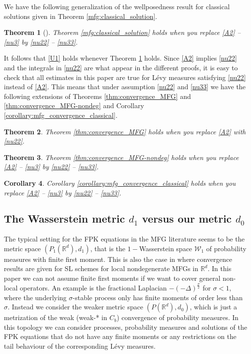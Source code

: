 \documentclass[a4paper,  twoside, 10pt, leqno]{amsart}
\newcommand{\rd}{\mathbb{R}^d}
\newtheorem{thm}{Theorem}[section]
\newtheorem{corollary}[thm]{Corollary}
\theoremstyle{remark}
\theoremstyle{definition}
\begin{document}
We have the following generalization of the wellposedness result for classical solutions
given in Theorem \ref{mfg:classical_solution}.
\begin{thm}[\cite{ersland2020classical}] \label{thm:classical_extension}
    Theorem \ref{mfg:classical_solution} holds when you replace \ref{A2} -- \ref{nu3} by \ref{nu22} -- \ref{nu33}.
 \end{thm}
 It follows that \ref{U1} holds whenever Theorem \ref{thm:classical_extension} holds. Since \ref{A2} implies \ref{nu22} and the integrals in \ref{nu22} are what appear in the different proofs, it is easy to check that all estimates in this paper are true for L\'evy measures satisfying \ref{nu22} instead of \ref{A2}. 
This means that under assumption \ref{nu22} and \ref{nu33} 
we have the following extensions of Theorems \ref{thm:convergence_MFG}
and \ref{thm:convergence_MFG-nondeg} and Corollary \ref{corollary:mfg_convergence_classical}.

\begin{thm}
    Theorem \ref{thm:convergence_MFG} holds when you replace \ref{A2} with \ref{nu22}.
\end{thm}

\begin{thm}
    Theorem \ref{thm:convergence_MFG-nondeg} holds when you replace \ref{A2} -- \ref{nu3} by \ref{nu22} -- \ref{nu33}.
 \end{thm}
\begin{corollary}
    Corollary \ref{corollary:mfg_convergence_classical} holds when you replace \ref{A2} -- \ref{nu3} by \ref{nu22} -- \ref{nu33}.
\end{corollary}

\subsection*{The Wasserstein metric $d_1$ versus our metric $d_0$}
The typical setting for the FPK
 equations in the MFG literature seems to be the metric space $ ( P_{1} ( \rd ) , d_{1} )$, that is the $1-$Wasserstein space
 $\mathcal{W}_{1}$ of probability measures with finite first moment. This is also the case in \cite{MR3828859} where convergence results are given for SL schemes for local nondegenerate MFGs in $\rd$. In this paper we can not assume finite first moments if we want
 to cover general non-local operators. An example is the fractional Laplacian $ -( - \Delta)^{\frac{\sigma}{2}}$ 
 for $\sigma < 1$, where the underlying
 $\sigma$-stable process only has finite moments
 of order less than $\sigma$.
 Instead we consider the weaker metric space $(P ( \rd ), d_{0} )$, which
 is just a metrization of the weak (weak-* in $C_{b}$) convergence of probability measures.
In this topology we can consider processes, probability measures and solutions
of the FPK equations that do not have
any finite moments or any restrictions on the tail behaviour of the corresponding L\'evy measures.
\end{document}
